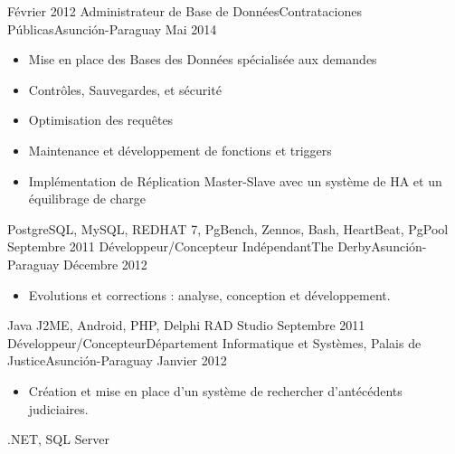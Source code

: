 \begin{experiences}
  \experience
    {Février 2012}   {Administrateur de Base de Données}{Contrataciones Públicas}{Asunción-Paraguay}
    {Mai 2014} {
                      \begin{itemize}
                        \item Mise en place des Bases des Données spécialisée aux demandes
                        \item Contrôles, Sauvegardes, et sécurité
                        \item Optimisation des requêtes
                        \item Maintenance et développement de fonctions et triggers
                        \item Implémentation de Réplication Master-Slave avec un système de HA et un équilibrage de charge
                      \end{itemize}
				}
                {PostgreSQL, MySQL, REDHAT 7, PgBench, Zennos, Bash, HeartBeat, PgPool}
  \emptySeparator
  \experience
    {Septembre 2011}   {Développeur/Concepteur Indépendant}{The Derby}{Asunción-Paraguay}
    {Décembre 2012} {
                      \begin{itemize}
                        \item Evolutions et corrections : analyse, conception et développement.
                      \end{itemize}
				}
                {Java J2ME, Android, PHP, Delphi RAD Studio}
  \emptySeparator
  \experience
    {Septembre 2011}   {Développeur/Concepteur}{Département Informatique et Systèmes, Palais de Justice}{Asunción-Paraguay}
    {Janvier 2012} {
                      \begin{itemize}
                        \item Création et mise en place d’un système de rechercher d’antécédents judiciaires.
                      \end{itemize}
				}
                {.NET, SQL Server}
  \emptySeparator
\end{experiences}
